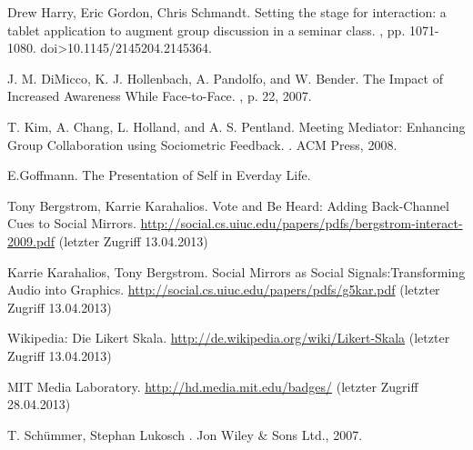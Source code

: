 \documentclass{seminarvorlage}
\begin{document}
\begin{thebibliography}{9}

Drew Harry, Eric Gordon, Chris Schmandt.
\newblock Setting the stage for interaction: a tablet application to augment group discussion in a seminar class. 
, pp. 1071-1080. doi>10.1145/2145204.2145364. 

J. M. DiMicco, K. J. Hollenbach, A. Pandolfo, and W. Bender.
\newblock The Impact of Increased Awareness While Face-to-Face.
, p. 22, 2007.

T. Kim, A. Chang, L. Holland, and A. S. Pentland.
\newblock Meeting Mediator: Enhancing Group Collaboration using Sociometric Feedback. 
. ACM Press, 2008.

E.Goffmann.
\newblock The Presentation of Self in Everday Life.

Tony Bergstrom, Karrie Karahalios. 
\newblock Vote and Be Heard: Adding Back-Channel Cues to Social Mirrors.
 \url {http://social.cs.uiuc.edu/papers/pdfs/bergstrom-interact-2009.pdf} (letzter Zugriff 13.04.2013)

Karrie Karahalios, Tony Bergstrom. 
\newblock Social Mirrors as Social Signals:Transforming Audio into Graphics.
 \url {http://social.cs.uiuc.edu/papers/pdfs/g5kar.pdf} (letzter Zugriff 13.04.2013)

Wikipedia: Die Likert Skala.
\newblock \url {http://de.wikipedia.org/wiki/Likert-Skala} (letzter Zugriff 13.04.2013)

 MIT Media Laboratory. 
\newblock \url {http://hd.media.mit.edu/badges/} (letzter Zugriff 28.04.2013)

T. Schümmer, Stephan Lukosch
. Jon Wiley \& Sons Ltd., 2007.

\end{thebibliography}
\end{document}
